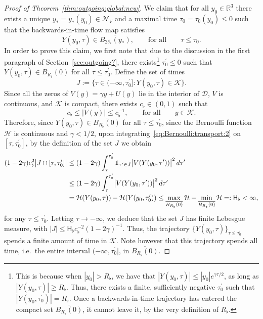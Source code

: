 \documentclass[11pt,reqno]{amsproc}
\numberwithin{equation}{section}
\theoremstyle{remark}
\begin{document}
\begin{proof}[Proof of Theorem~\ref{thm:outgoing:global:new}]
We claim that for all $y_0 \in \mathbb{R}^3$ there exists a unique $y_*=y_*(y_0) \in \mathcal{N}_V$ and a maximal time $\tau_0 = \tau_0(y_0)\leq 0$ such that the backwards-in-time flow map satisfies
\begin{equation}
Y(y_0,\tau) \in \overline{B_{2\delta_*}(y_*)}, \qquad \mbox{for all} \qquad \tau \leq  \tau_0.
\label{eq:backwards:to:check:new}
\end{equation}
In order to prove this claim, we first note that due to the discussion in the first paragraph of Section~\ref{sec:outgoing?}, there exists\footnote{This is because when $|y_0| > R_\flat$, we have that $|Y(y_0,\tau)| \leq |y_0| e^{\gamma \tau/2}$, as long as $|Y(y_0,\tau)| \geq R_\flat$. Thus, there exists a finite, sufficiently negative $\tau_0^\prime$ such that $|Y(y_0,\tau_0^\prime)| = R_\flat$. Once a backwards-in-time trajectory has entered the compact set $\overline{B_{R_\flat}(0)}$, it cannot leave it, by the very definition of $R_\flat$.} $\tau_0^\prime\leq 0$ such that $Y(y_0,\tau) \in \overline{B_{R_\flat}(0)}$ for all $\tau \leq \tau_0^\prime$. Define the set of times 
\[
J:= \{ \tau \in (-\infty,\tau_0^\prime] \colon Y(y_0,\tau) \in \mathcal{K} \}.
\]
Since all the zeros of $V(y) = \gamma y + U(y)$ lie in the interior of $\mathcal{D}$,  $V$ is continuous, and $\mathcal{K}$ is compact, there exists $c_\flat \in (0,1)$ such that 
\[
c_\flat \leq |V(y)| \leq c_\flat^{-1},
\qquad
\mbox{for all}
\qquad
y\in \mathcal{K}.
\]
Therefore, since $Y(y_0,\tau) \in \overline{B_{R_\flat}(0)}$ for all $\tau \leq \tau_0^\prime$, since the Bernoulli function $\mathcal{H}$ is continuous and $\gamma<1/2$, upon integrating~\eqref{eq:Bernoulli:transport:2} on $[\tau,\tau_0^\prime]$, by the definition of the set $J$ we obtain
\begin{align*}
(1-2\gamma) c_\flat^2 \bigl| J \cap [\tau,\tau_0^\prime] \bigr| 
&\leq  (1-2\gamma)  \int_{\tau}^{\tau_0^\prime} {\bf 1}_{\tau^\prime \in J} \bigl|V(Y(y_0,\tau^\prime))\bigr|^2 \, d\tau^\prime
\\
&\leq 
(1-2\gamma) \int_{\tau}^{\tau_0^\prime} \bigl|V(Y(y_0,\tau^\prime))\bigr|^2 \, d\tau^\prime
\\
&= \mathcal{H}(Y(y_0,\tau)) - \mathcal{H}(Y(y_0,\tau_0^\prime))
\leq \max_{\overline{B_{R_\flat}(0)}} \mathcal{H} - \min_{\overline{B_{R_\flat}(0)}} \mathcal{H} 
=: \mathsf{H}_\flat < \infty,
\end{align*}
for any $\tau \leq \tau_0^\prime$. Letting $\tau \to -\infty$, we deduce that the set $J$ has finite Lebesgue measure, with $|J| \leq \mathsf{H}_\flat c_\flat^{-2} (1-2\gamma)^{-1}$.
Thus, the trajectory $\{ Y(y_0,\tau) \}_{\tau \leq \tau_0^\prime}$ spends a finite amount of time in $\mathcal{K}$. Note however that this trajectory spends all time, i.e.~the entire interval $(-\infty,\tau_0^\prime]$, in $\overline{B_{R_\flat}(0)}$.


\end{proof}
\end{document}

